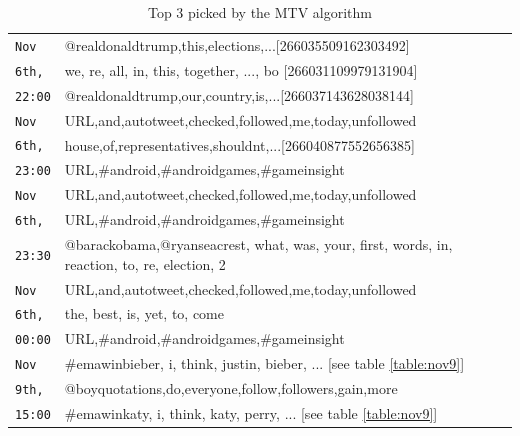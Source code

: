 \documentclass[letterpaper,12pt,titlepage,oneside,final]{book}
\begin{document}
 
 \begin{table}
 \begin{center}
\small
\def\arraystretch{1.1}
\begin{tabular}{|p{.6cm}|p{7.5cm}|}

\hline

\texttt{Nov}
& @realdonaldtrump,this,elections,...[266035509162303492] \\\cline{2-2} %
\texttt{6th,}
&we, re, all, in, this, together, ..., bo [266031109979131904]  \\\cline{2-2} %
\texttt{22:00} & @realdonaldtrump,our,country,is,...[266037143628038144] \\\hline %




\texttt{Nov}
&URL,and,autotweet,checked,followed,me,today,unfollowed \\\cline{2-2}
\texttt{6th,}
&house,of,representatives,shouldnt,...[266040877552656385]  \\\cline{2-2} %
\texttt{23:00} & URL,\#android,\#androidgames,\#gameinsight \\\hline 


\texttt{Nov}
&URL,and,autotweet,checked,followed,me,today,unfollowed \\\cline{2-2}
\texttt{6th,}
&URL,\#android,\#androidgames,\#gameinsight  \\\cline{2-2} 
\texttt{23:30} &@barackobama,@ryanseacrest, what, was, your, first, words, in, reaction, to, re, election, 2\\\hline 


\texttt{Nov}
&URL,and,autotweet,checked,followed,me,today,unfollowed \\\cline{2-2}
\texttt{6th,}
&the, best, is, yet, to, come \\\cline{2-2} 
\texttt{00:00} & URL,\#android,\#androidgames,\#gameinsight \\\hline 



\texttt{Nov}
& \#emawinbieber, i, think, justin, bieber, ... [see table \ref{table:nov9}] \\\cline{2-2}
\texttt{9th,}
&@boyquotations,do,everyone,follow,followers,gain,more \\\cline{2-2} 
\texttt{15:00} & \#emawinkaty, i, think, katy, perry, ... [see table \ref{table:nov9}] \\\hline 
\end{tabular}
\end{center}
\caption{Top 3 picked by the MTV algorithm}
 \label{table:mtv}
\end{table}
\end{document}

